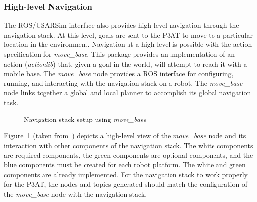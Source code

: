 \subsubsection*{High-level Navigation}
The ROS/USARSim interface also provides high-level navigation through the navigation stack. At this level, goals are sent to the P3AT to move to a particular location in the environment. Navigation at a high level is possible with the action specification for {\it move\_base}. This package provides an implementation of an action ({\it actionlib}) that, given a goal in the world, will attempt to reach it with a mobile base. The {\it move\_base} node provides a ROS interface for configuring, running, and interacting with the navigation stack on a robot. The {\it move\_base} node links together a global and local planner to accomplish its global navigation task.



\begin{figure}[t!]
\centering
{}
\caption{\label{fig:navigation_stack}Navigation stack setup using {\it move\_base}}
\end{figure}

Figure~\ref{fig:navigation_stack} (taken from~\cite{MoveBase}) depicts a high-level view of the {\it move\_base} node and its interaction with other components of the navigation stack. The white components are required components, the green components are optional components, and the blue components must be created for each robot platform. The white and green components are already implemented. For the navigation stack to work properly for the P3AT, the nodes and topics generated should match the configuration of the {\it move\_base} node with the navigation stack.


